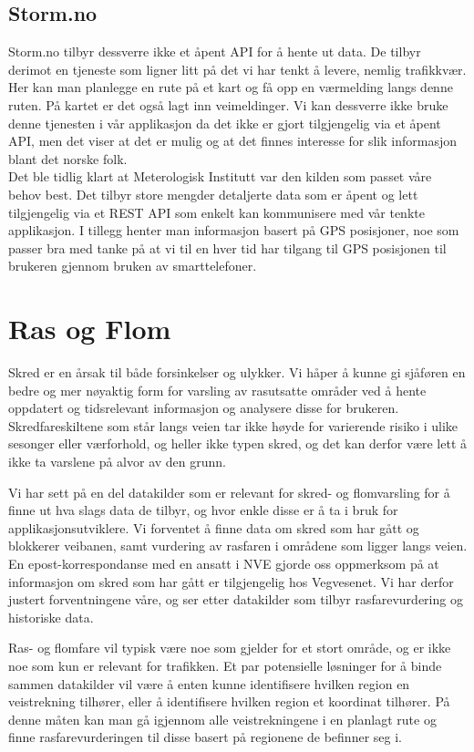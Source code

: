 \documentclass[a4paper,norsk,oneside]{book}
\begin{document}
\subsection{Storm.no}
Storm.no tilbyr dessverre ikke et åpent API for å hente ut data. De tilbyr derimot en tjeneste som ligner litt på det vi har tenkt å levere, nemlig trafikkvær. Her kan man planlegge en rute på et kart og få opp en værmelding langs denne ruten. På kartet er det også lagt inn veimeldinger. Vi kan dessverre ikke bruke denne tjenesten i vår applikasjon da det ikke er gjort tilgjengelig via et åpent API, men det viser at det er mulig og at det finnes interesse for slik informasjon blant det norske folk.\\
\newline
Det ble tidlig klart at Meterologisk Institutt var den kilden som passet våre behov best. Det tilbyr store mengder detaljerte data som er åpent og lett tilgjengelig via et REST API som enkelt kan kommunisere med vår tenkte applikasjon. I tillegg henter man informasjon basert på GPS posisjoner, noe som passer bra med tanke på at vi til en hver tid har tilgang til GPS posisjonen til brukeren gjennom bruken av smarttelefoner.\cite{storm}

\section{Ras og Flom}
Skred er en årsak til både forsinkelser og ulykker. Vi håper å kunne gi sjåføren en bedre og mer nøyaktig form for varsling av rasutsatte områder ved å hente oppdatert og tidsrelevant informasjon og analysere disse for brukeren. Skredfareskiltene som står langs veien tar ikke høyde for varierende risiko i ulike sesonger eller værforhold, og heller ikke typen skred, og det kan derfor være lett å ikke ta varslene på alvor av den grunn.

Vi har sett på en del datakilder som er relevant for skred- og flomvarsling for å finne ut hva slags data de tilbyr, og hvor enkle disse er å ta i bruk for applikasjonsutviklere. Vi forventet å finne data om skred som har gått og blokkerer veibanen, samt vurdering av rasfaren i områdene som ligger langs veien. En epost-korrespondanse med en ansatt i NVE gjorde oss oppmerksom på at informasjon om skred som har gått er tilgjengelig hos Vegvesenet. Vi har derfor justert forventningene våre, og ser etter datakilder som tilbyr rasfarevurdering og historiske data.

Ras- og flomfare vil typisk være noe som gjelder for et stort område, og er ikke noe som kun er relevant for trafikken. Et par potensielle løsninger for å binde sammen datakilder vil være å enten kunne identifisere hvilken region en veistrekning tilhører, eller å identifisere hvilken region et koordinat tilhører. På denne måten kan man gå igjennom alle veistrekningene i en planlagt rute og finne rasfarevurderingen til disse basert på regionene de befinner seg i.
\end{document}

